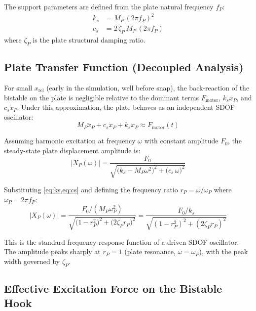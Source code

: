 \documentclass[11pt,letterpaper]{article}
\begin{document}
The support parameters are defined from the plate natural frequency $f_P$:
\begin{align}
  k_s &= M_P\,(2\pi f_P)^2
  \label{eq:ks}\\
  c_s &= 2\,\zeta_P\,M_P\,(2\pi f_P)
  \label{eq:cs}
\end{align}
where $\zeta_P$ is the plate structural damping ratio.

\subsection{Plate Transfer Function (Decoupled Analysis)}
\label{ssec:plateTF}

For small $x_{\mathrm{rel}}$ (early in the simulation, well before snap), the
back-reaction of the bistable on the plate is negligible relative to the dominant
terms $F_{\mathrm{motor}}$, $k_s x_P$, and $c_s\dot{x}_P$. Under this
approximation, the plate behaves as an independent SDOF oscillator:
\begin{equation}
  M_P\ddot{x}_P + c_s\dot{x}_P + k_s x_P \approx F_{\mathrm{motor}}(t)
  \label{eq:plateSDOF}
\end{equation}

Assuming harmonic excitation at frequency $\omega$ with constant amplitude $F_0$,
the steady-state plate displacement amplitude is:
\begin{equation}
  \bigl|X_P(\omega)\bigr|
  = \frac{F_0}{\sqrt{\bigl(k_s - M_P\omega^2\bigr)^2
    + \bigl(c_s\,\omega\bigr)^2}}
  \label{eq:Xplate}
\end{equation}

Substituting \cref{eq:ks,eq:cs} and defining the frequency ratio
$r_P = \omega / \omega_P$ where $\omega_P = 2\pi f_P$:
\begin{equation}
  \bigl|X_P(\omega)\bigr|
  = \frac{F_0 / (M_P\omega_P^2)}{\sqrt{\bigl(1-r_P^2\bigr)^2
    + \bigl(2\zeta_P r_P\bigr)^2}}
  = \frac{F_0 / k_s}{\sqrt{(1-r_P^2)^2 + (2\zeta_P r_P)^2}}
  \label{eq:XplateNorm}
\end{equation}

This is the standard frequency-response function of a driven SDOF oscillator.
The amplitude peaks sharply at $r_P = 1$ (plate resonance, $\omega = \omega_P$),
with the peak width governed by $\zeta_P$.

\subsection{Effective Excitation Force on the Bistable Hook}
\label{ssec:Feff}
\end{document}
